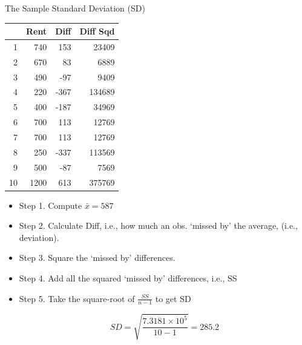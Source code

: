 \documentclass[14pt]{beamer}\usepackage[]{graphicx}\usepackage[]{color}
\begin{document}
\begin{frame}[fragile]{The Sample Standard Deviation (SD)}

\begin{minipage}[ht]{5cm}

{\footnotesize{
\begin{table}[ht]
\centering
\begin{tabular}{rrrr}
  \hline
 & Rent & Diff & Diff Sqd \\ 
  \hline
1 & 740 & 153 & 23409 \\ 
  2 & 670 & 83 & 6889 \\ 
  3 & 490 & -97 & 9409 \\ 
  4 & 220 & -367 & 134689 \\ 
  5 & 400 & -187 & 34969 \\ 
  6 & 700 & 113 & 12769 \\ 
  7 & 700 & 113 & 12769 \\ 
  8 & 250 & -337 & 113569 \\ 
  9 & 500 & -87 & 7569 \\ 
  10 & 1200 & 613 & 375769 \\ 
   \hline
\end{tabular}
\end{table}

}}

\end{minipage}
\begin{minipage}[ht]{6cm}

{\footnotesize{
\begin{itemize}
\item<1-> Step 1. Compute $\bar{x} = 587$
\item<2-> Step 2. Calculate Diff, i.e., how much an obs. `missed by' the average, (i.e., deviation).
\item<3-> Step 3. Square the `missed by' differences.
\item<4-> Step 4. Add all the squared `missed by' differences, i.e., SS
\item<5-> Step 5. Take the square-root of $\frac{SS}{n - 1}$ to get SD

\begin{equation*}
SD = \sqrt{ \frac{\ensuremath{7.3181\times 10^{5}}}{ 10 - 1 }} = 285.2
\end{equation*}

\end{itemize}
}}
\end{minipage}

\end{frame}
\end{document}

